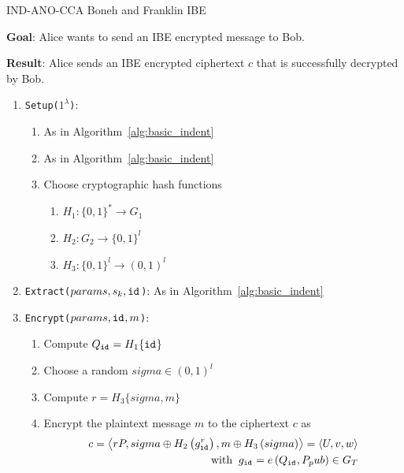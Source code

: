 \begin{algorithm}
\caption{IND-ANO-CCA Boneh and Franklin IBE~\cite{art:BonehF01}}
\label{alg:full_indent}
\begin{description}
 \item \textbf{Goal}: Alice wants to send an IBE encrypted message to Bob.
 
 \item \textbf{Result}: Alice sends an IBE encrypted ciphertext $c$ that is successfully decrypted by Bob.
\end{description}
 \begin{enumerate}
  \item \texttt{Setup($1^{\lambda}$)}: 
  \begin{enumerate}
   \item As in Algorithm~\ref{alg:basic_indent}
   \item As in Algorithm~\ref{alg:basic_indent}
   \item Choose cryptographic hash functions
    \begin{enumerate}
     \item $H_1: \{ 0,1  \}^* \rightarrow G_1$
     \item $H_2: G_2 \rightarrow \{ 0,1 \}^l$
     \item $H_3: \{ 0,1 \}^l \rightarrow \left( 0,1 \right)^l$
    \end{enumerate}
  \end{enumerate}
  \item \texttt{Extract($params, s_k, \mathtt{id}_{}$)}: As in Algorithm~\ref{alg:basic_indent}
   \item \texttt{Encrypt($params, \mathtt{id}_{}, m$)}:
   \begin{enumerate}
    \item Compute $Q_{\mathtt{id}_{}} = H_1 \{ \mathtt{id}_{} \}$
    \item Choose a random $sigma \in \left( 0,1 \right)^l$
    \item Compute $r = H_3 \{ sigma, m \}$
    \item Encrypt the plaintext message $m$ to the ciphertext $c$ as
    \begin{equation*}
     \begin{split}
      c = \left< rP, sigma \oplus H_2 \left( g_{\mathtt{id}_{}}^r\right), m \oplus H_3 \left( sigma \right) \right> = \left< U, v, w \right> \\ 
     \; \; \textrm{with} \; \; g_{\mathtt{id}_{}} = e \left( Q_{\mathtt{id}_{}}, P_pub \right) \in G_T
     \end{split}
    \end{equation*}

\end{enumerate}
\end{enumerate}
\end{algorithm}
